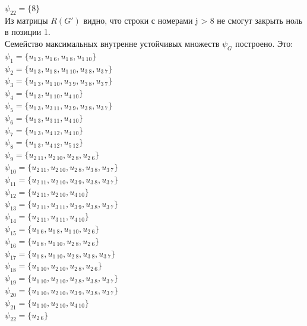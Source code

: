 \documentclass[a4paper,12pt]{article}
\begin{document}
\noindent
$\psi_22 = \{8\}$ \\
Из матрицы $R(G')$ видно, что строки с номерами j > 8 не смогут закрыть ноль в позиции 1. \\

\noindent
Семейство максимальных внутренне устойчивых множеств $\psi_G$ построено. Это:\\
$\psi_{1} = \{u_{1\ 3},u_{1\ 6},u_{1\ 8},u_{1\ 10}\}$\\
$\psi_{2} = \{u_{1\ 3},u_{1\ 8},u_{1\ 10},u_{3\ 8},u_{3\ 7}\}$\\
$\psi_{3} = \{u_{1\ 3},u_{1\ 10},u_{3\ 9},u_{3\ 8},u_{3\ 7}\}$\\
$\psi_{4} = \{u_{1\ 3},u_{1\ 10},u_{4\ 10}\}$\\
$\psi_{5} = \{u_{1\ 3},u_{3\ 11},u_{3\ 9},u_{3\ 8},u_{3\ 7}\}$\\
$\psi_{6} = \{u_{1\ 3},u_{3\ 11},u_{4\ 10}\}$\\
$\psi_{7} = \{u_{1\ 3},u_{4\ 12},u_{4\ 10}\}$\\
$\psi_{8} = \{u_{1\ 3},u_{4\ 12},u_{5\ 12}\}$\\
$\psi_{9} = \{u_{2\ 11},u_{2\ 10},u_{2\ 8},u_{2\ 6}\}$\\
$\psi_{10} = \{u_{2\ 11},u_{2\ 10},u_{2\ 8},u_{3\ 8},u_{3\ 7}\}$\\
$\psi_{11} = \{u_{2\ 11},u_{2\ 10},u_{3\ 9},u_{3\ 8},u_{3\ 7}\}$\\
$\psi_{12} = \{u_{2\ 11},u_{2\ 10},u_{4\ 10}\}$\\
$\psi_{13} = \{u_{2\ 11},u_{3\ 11},u_{3\ 9},u_{3\ 8},u_{3\ 7}\}$\\
$\psi_{14} = \{u_{2\ 11},u_{3\ 11},u_{4\ 10}\}$\\
$\psi_{15} = \{u_{1\ 6},u_{1\ 8},u_{1\ 10},u_{2\ 6}\}$\\
$\psi_{16} = \{u_{1\ 8},u_{1\ 10},u_{2\ 8},u_{2\ 6}\}$\\
$\psi_{17} = \{u_{1\ 8},u_{1\ 10},u_{2\ 8},u_{3\ 8},u_{3\ 7}\}$\\
$\psi_{18} = \{u_{1\ 10},u_{2\ 10},u_{2\ 8},u_{2\ 6}\}$\\
$\psi_{19} = \{u_{1\ 10},u_{2\ 10},u_{2\ 8},u_{3\ 8},u_{3\ 7}\}$\\
$\psi_{20} = \{u_{1\ 10},u_{2\ 10},u_{3\ 9},u_{3\ 8},u_{3\ 7}\}$\\
$\psi_{21} = \{u_{1\ 10},u_{2\ 10},u_{4\ 10}\}$\\
$\psi_{22} = \{u_{2\ 6}\}$\\
\end{document}
